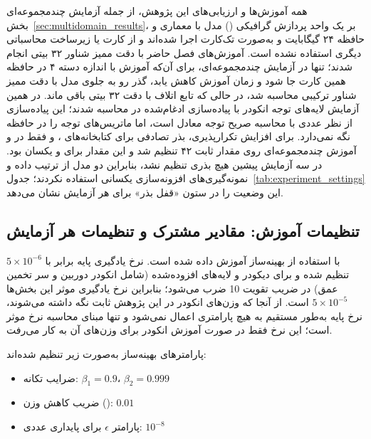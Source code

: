 همه آموزش‌ها و ارزیابی‌های این پژوهش، از جمله آزمایش چندمجموعه‌ای بخش~\ref{sec:multidomain_results}، بر یک واحد پردازش گرافیکی ()  مدل  با معماری  و حافظه ۲۴ گیگابایت و به‌صورت تک‌کارت اجرا شده‌اند و از کارت یا زیرساخت محاسباتی دیگری استفاده نشده است. آموزش‌های فصل حاضر با دقت ممیز شناور ۳۲ بیتی انجام شدند؛ تنها در آزمایش چندمجموعه‌ای، برای آن‌که آموزش  با اندازه دسته ۴ در حافظه همین کارت جا شود و زمان آموزش کاهش یابد، گذر رو به جلوی مدل با دقت ممیز شناور ترکیبی  محاسبه شد، در حالی که تابع اتلاف با دقت ۳۲ بیتی باقی ماند. در همین آزمایش لایه‌های توجه انکودر با پیاده‌سازی ادغام‌شده  در  محاسبه شدند؛ این پیاده‌سازی از نظر عددی با محاسبه صریح توجه معادل است، اما ماتریس‌های توجه را در حافظه نگه نمی‌دارد.
برای افزایش تکرارپذیری، بذر تصادفی برای کتابخانه‌های ،  و  فقط در \focaljitterconfig{} و آموزش چندمجموعه‌ای روی مقدار ثابت ۴۲ تنظیم شد و این مقدار برای \proposedmodel{} و \controlmodel{} یکسان بود. در سه آزمایش پیشین هیچ بذری تنظیم نشد، بنابراین دو مدل از ترتیب داده و نمونه‌گیری‌های افزونه‌سازی یکسانی استفاده نکردند؛ جدول~\ref{tab:experiment_settings} این وضعیت را در ستون «قفل بذر» برای هر آزمایش نشان می‌دهد.


\subsection[تنظیمات آموزش: مقادیر مشترک و تنظیمات هر آزمایش]{تنظیمات آموزش: مقادیر مشترک و تنظیمات هر آزمایش}

\proposedmodel{} با استفاده از بهینه‌ساز  \cite{Loshchilov2019AdamW} آموزش داده شده است. نرخ یادگیری پایه برابر با $5 \times 10^{-6}$ تنظیم شده و برای دیکودر و لایه‌های افزوده‌شده (شامل انکودر دوربین و سر تخمین عمق) در ضریب تقویت 10 ضرب می‌شود؛ بنابراین نرخ یادگیری موثر این بخش‌ها $5 \times 10^{-5}$ است. از آنجا که وزن‌های انکودر  در این پژوهش ثابت نگه داشته می‌شوند، نرخ پایه به‌طور مستقیم به هیچ پارامتری اعمال نمی‌شود و تنها مبنای محاسبه نرخ موثر است؛ این نرخ فقط در صورت آموزش انکودر برای وزن‌های آن به کار می‌رفت.

پارامترهای بهینه‌ساز به‌صورت زیر تنظیم شده‌اند:

\begin{itemize}
 \item ضرایب تکانه: $\beta_1 = 0.9$، $\beta_2 = 0.999$
 \item ضریب کاهش وزن (): $0.01$
 \item پارامتر $\epsilon$ برای پایداری عددی: $10^{-8}$
\end{itemize}

